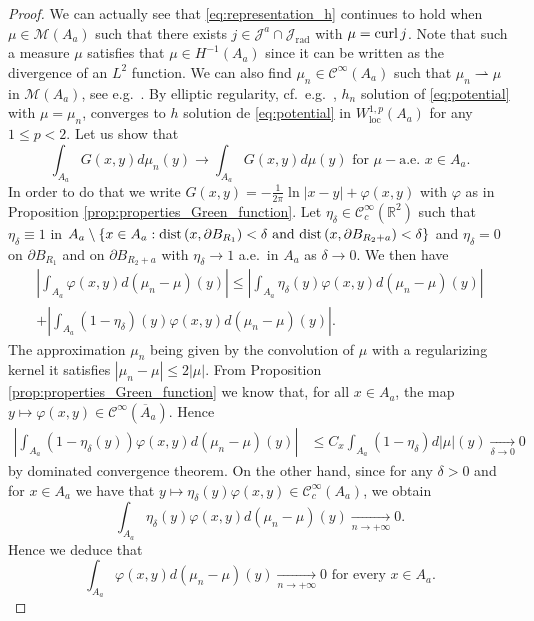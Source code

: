 \documentclass[12pt,reqno]{amsart}
\def\C{{\mathcal C}}
\def\M{{\mathcal M}}
\def\dist{{\rm dist\,}}
\def\curl{{\rm curl\,}}
\def \p {\partial}
\def \J {{\mathcal J}}
\newcommand{\R}{\mathbb{R}}
\numberwithin{equation}{section}
\begin{document}
\begin{proof}
We can actually see that \eqref{eq:representation_h} continues to hold when \(\mu \in \M(A_a)\) such that there exists \(j\in \J^a\cap \J_{\text{rad}} \) with \(\mu=\curl j\). Note that such a measure \(\mu\) satisfies that \(\mu \in H^{-1}(A_a)\) since it can be written as the divergence of an \(L^2\) function.  We can also find \(\mu_n\in \C^\infty(A_a)\) such that \(\mu_n \rightharpoonup \mu\) in \(\M(A_a)\), see e.g.\ \cite[Proposition 2.7]{Ponce_2016}. By elliptic regularity, cf.\ e.g.\ \cite[Proposition 5.1]{Ponce_2016}, \(h_n\) solution of \eqref{eq:potential} with \(\mu=\mu_n\), converges to \(h\) solution de \eqref{eq:potential} in \(W^{1,p}_{\text{loc}}(A_a)\) for any \(1\leq p<2\).  Let us show that
\begin{equation*}
\int_{A_a} G(x,y) d \mu_n(y) \rightarrow \int_{A_a} G(x,y) d \mu(y) \text{ for } \mu-\text{a.e. } x\in A_a.
\end{equation*}
In order to do that we write \(G(x,y)=-\frac{1}{2\pi}\ln |x-y|+\varphi (x,y)\) with \(\varphi\) as in Proposition \ref{prop:properties_Green_function}. Let \(\eta_\delta\in \C^\infty_c(\R^2)\) such that \(\eta_\delta\equiv 1\) in \(A_a\setminus \{x \in A_a: \dist (x,\p B_{R_1})<\delta \text{ and } \dist( x, \p B_{R_2+a})<\delta\}\) and \(\eta_\delta =0\) on \(\p B_{R_1}\) and on \( \p B_{R_2+a}\) with \(\eta_\delta \to 1\) a.e.\ in \(A_a\) as \(\delta\to 0\). We then have
\begin{align*}
\left| \int_{A_a}\varphi(x,y) d (\mu_n-\mu)(y) \right|\leq \left| \int_{A_a} \eta_\delta(y) \varphi(x,y) d (\mu_n-\mu)(y) \right| \\
+ \left|\int_{A_a} (1-\eta_\delta)(y) \varphi(x,y) d (\mu_n-\mu)(y) \right|.
\end{align*}
The approximation \(\mu_n\) being given by the convolution of \(\mu\) with a regularizing kernel it satisfies \(|\mu_n-\mu| \leq 2 |\mu|\). From Proposition \ref{prop:properties_Green_function} we know that, for all \(x\in A_a\), the map \(y \mapsto \varphi(x,y)\in \C^\infty(\overline{A}_a)\). Hence
\begin{align*}
\left|\int_{A_a} (1-\eta_\delta(y)) \varphi(x,y) d (\mu_n-\mu)(y) \right|&\leq C_x \int_{A_a}(1-\eta_\delta) d |\mu|(y)  \xrightarrow[\delta \to 0]{} 0
\end{align*}
by dominated convergence theorem. On the other hand, since for any \(\delta>0\) and  for \(x\in A_a\) we have that  \(y \mapsto \eta_\delta(y) \varphi(x,y)\in \C^\infty_c(A_a)\), we obtain
\[\int_{A_a} \eta_\delta(y) \varphi(x,y) d (\mu_n-\mu)(y)\xrightarrow[n \to +\infty]{} 0.\]
Hence we deduce that 
\begin{equation}\label{eq:cv_varphi}
\int_{A_a}  \varphi(x,y) d (\mu_n-\mu)(y)\xrightarrow[n \to +\infty]{} 0 \text{ for every } x\in A_a.
\end{equation}


\end{proof}
\end{document}
